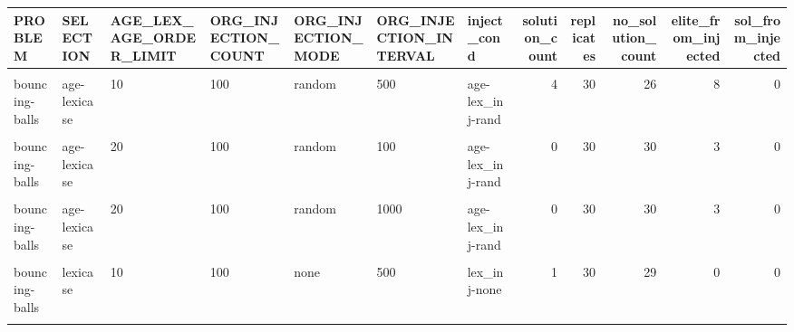 \documentclass[
]{book}
\begin{document}
\begin{table}
\begin{tabular}{l|l|l|l|l|l|l|r|r|r|r|r}
\hline
PROBLEM & SELECTION & AGE\_LEX\_AGE\_ORDER\_LIMIT & ORG\_INJECTION\_COUNT & ORG\_INJECTION\_MODE & ORG\_INJECTION\_INTERVAL & inject\_cond & solution\_count & replicates & no\_solution\_count & elite\_from\_injected & sol\_from\_injected\\
\hline
\cellcolor{gray!6}{bouncing-balls} & \cellcolor{gray!6}{age-lexicase} & \cellcolor{gray!6}{10} & \cellcolor{gray!6}{100} & \cellcolor{gray!6}{random} & \cellcolor{gray!6}{100} & \cellcolor{gray!6}{age-lex\_inj-rand} & \cellcolor{gray!6}{1} & \cellcolor{gray!6}{30} & \cellcolor{gray!6}{29} & \cellcolor{gray!6}{6} & \cellcolor{gray!6}{0}\\
\hline
bouncing-balls & age-lexicase & 10 & 100 & random & 500 & age-lex\_inj-rand & 4 & 30 & 26 & 8 & 0\\
\hline
\cellcolor{gray!6}{bouncing-balls} & \cellcolor{gray!6}{age-lexicase} & \cellcolor{gray!6}{10} & \cellcolor{gray!6}{100} & \cellcolor{gray!6}{random} & \cellcolor{gray!6}{1000} & \cellcolor{gray!6}{age-lex\_inj-rand} & \cellcolor{gray!6}{1} & \cellcolor{gray!6}{30} & \cellcolor{gray!6}{29} & \cellcolor{gray!6}{6} & \cellcolor{gray!6}{0}\\
\hline
bouncing-balls & age-lexicase & 20 & 100 & random & 100 & age-lex\_inj-rand & 0 & 30 & 30 & 3 & 0\\
\hline
\cellcolor{gray!6}{bouncing-balls} & \cellcolor{gray!6}{age-lexicase} & \cellcolor{gray!6}{20} & \cellcolor{gray!6}{100} & \cellcolor{gray!6}{random} & \cellcolor{gray!6}{500} & \cellcolor{gray!6}{age-lex\_inj-rand} & \cellcolor{gray!6}{1} & \cellcolor{gray!6}{30} & \cellcolor{gray!6}{29} & \cellcolor{gray!6}{3} & \cellcolor{gray!6}{0}\\
\hline
bouncing-balls & age-lexicase & 20 & 100 & random & 1000 & age-lex\_inj-rand & 0 & 30 & 30 & 3 & 0\\
\hline
\cellcolor{gray!6}{bouncing-balls} & \cellcolor{gray!6}{lexicase} & \cellcolor{gray!6}{10} & \cellcolor{gray!6}{100} & \cellcolor{gray!6}{none} & \cellcolor{gray!6}{100} & \cellcolor{gray!6}{lex\_inj-none} & \cellcolor{gray!6}{3} & \cellcolor{gray!6}{30} & \cellcolor{gray!6}{27} & \cellcolor{gray!6}{0} & \cellcolor{gray!6}{0}\\
\hline
bouncing-balls & lexicase & 10 & 100 & none & 500 & lex\_inj-none & 1 & 30 & 29 & 0 & 0\\
\hline
\cellcolor{gray!6}{bouncing-balls} & \cellcolor{gray!6}{lexicase} & \cellcolor{gray!6}{10} & \cellcolor{gray!6}{100} & \cellcolor{gray!6}{none} & \cellcolor{gray!6}{1000} & \cellcolor{gray!6}{lex\_inj-none} & \cellcolor{gray!6}{0} & \cellcolor{gray!6}{30} & \cellcolor{gray!6}{30} & \cellcolor{gray!6}{0} & \cellcolor{gray!6}{0}\\

\end{tabular}
\end{table}
\end{document}
